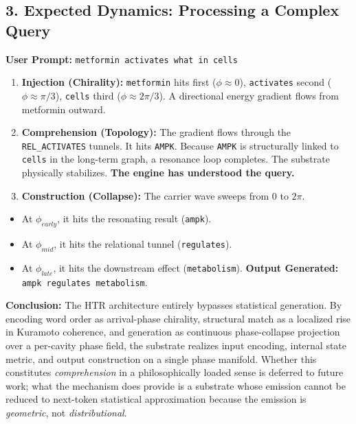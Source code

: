 \documentclass[
  11pt,
  a4paper,
]{article}
\providecommand{\tightlist}{%
  \setlength{\itemsep}{0pt}\setlength{\parskip}{0pt}}
\begin{document}
\subsection{3. Expected Dynamics: Processing a Complex
Query}\label{expected-dynamics-processing-a-complex-query}

\textbf{User Prompt:} \texttt{metformin\ activates\ what\ in\ cells}

\begin{enumerate}
\def\labelenumi{\arabic{enumi}.}
\tightlist
\item
  \textbf{Injection (Chirality):} \texttt{metformin} hits first
  (\(\phi \approx 0\)), \texttt{activates} second
  (\(\phi \approx \pi/3\)), \texttt{cells} third
  (\(\phi \approx 2\pi/3\)). A directional energy gradient flows from
  metformin outward.
\item
  \textbf{Comprehension (Topology):} The gradient flows through the
  \texttt{REL\_ACTIVATES} tunnels. It hits \texttt{AMPK}. Because
  \texttt{AMPK} is structurally linked to \texttt{cells} in the
  long-term graph, a resonance loop completes. The substrate physically
  stabilizes. \textbf{The engine has understood the query.}
\item
  \textbf{Construction (Collapse):} The carrier wave sweeps from \(0\)
  to \(2\pi\).
\end{enumerate}

\begin{itemize}
\tightlist
\item
  At \(\phi_{early}\), it hits the resonating result (\texttt{ampk}).
\item
  At \(\phi_{mid}\), it hits the relational tunnel (\texttt{regulates}).
\item
  At \(\phi_{late}\), it hits the downstream effect
  (\texttt{metabolism}). \textbf{Output Generated:}
  \texttt{ampk\ regulates\ metabolism}.
\end{itemize}

\textbf{Conclusion:} The HTR architecture entirely bypasses statistical
generation. By encoding word order as arrival-phase chirality,
structural match as a localized rise in Kuramoto coherence, and
generation as continuous phase-collapse projection over a per-cavity
phase field, the substrate realizes input encoding, internal state
metric, and output construction on a single phase manifold. Whether this
constitutes \emph{comprehension} in a philosophically loaded sense is
deferred to future work; what the mechanism does provide is a substrate
whose emission cannot be reduced to next-token statistical approximation
because the emission is \emph{geometric}, not \emph{distributional}.
\end{document}
